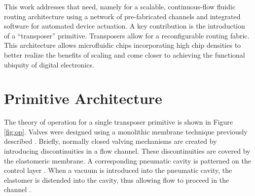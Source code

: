This work addresses that need, namely for a scalable, continuous-flow fluidic routing architecture using a network of pre-fabricated channels and integrated software for automated device actuation. A key contribution is the introduction of a ``transposer'' primitive. Transposers allow for a reconfigurable routing fabric. This architecture allows microfluidic chips incorporating high chip densities to better realize the benefits of scaling and come closer to achieving the functional ubiquity of digital electronics.

\section{Primitive Architecture}
\label{sec:primArch}
The theory of operation for a single transposer primitive is shown in Figure \ref{fig:op}. Valves were designed using a monolithic membrane technique previously described \cite{grover2003monolithic}. Briefly, normally closed valving mechanisms are created by introducing discontinuities in a flow channel. These discontinuities are covered by the elastomeric membrane. A corresponding pneumatic cavity is patterned on the control layer \cite{grover2006development}. When a vacuum is introduced into the pneumatic cavity, the elastomer is distended into the cavity, thus allowing flow to proceed in the channel \cite{nguyen2012}. 

